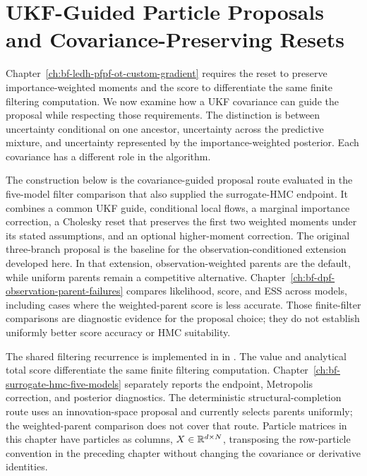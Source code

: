 \chapter{UKF-Guided Particle Proposals and Covariance-Preserving Resets}
\label{ch:bf-ukf-covariance-proposal}

Chapter~\ref{ch:bf-ledh-pfpf-ot-custom-gradient} requires the reset to preserve
importance-weighted moments and the score to differentiate the same finite
filtering computation. We now examine how a UKF covariance can guide the
proposal while respecting those requirements. The distinction is between
uncertainty conditional on one ancestor, uncertainty across the predictive
mixture, and uncertainty represented by the importance-weighted posterior.
Each covariance has a different role in the algorithm.

The construction below is the covariance-guided proposal route evaluated in the
five-model filter comparison that also supplied the surrogate-HMC endpoint.
It combines a common UKF guide, conditional
local flows, a marginal importance correction, a Cholesky reset that preserves
the first two weighted moments under its stated assumptions, and an optional
higher-moment correction. The original three-branch proposal is the baseline
for the observation-conditioned extension developed here. In that extension,
observation-weighted parents are the default, while uniform parents remain a
competitive alternative. Chapter~\ref{ch:bf-dpf-observation-parent-failures}
compares likelihood, score, and ESS across models, including cases where the
weighted-parent score is less accurate. Those finite-filter comparisons are
diagnostic evidence for the proposal choice; they do not establish uniformly
better score accuracy or HMC suitability.

The shared filtering recurrence is implemented in
 in
. The value and
analytical total score differentiate the same finite filtering computation.
Chapter~\ref{ch:bf-surrogate-hmc-five-models} separately reports the endpoint,
Metropolis correction, and posterior diagnostics. The deterministic
structural-completion route uses an innovation-space proposal and currently
selects parents uniformly; the weighted-parent comparison does not cover that
route. Particle matrices in this chapter have particles as columns,
\(X\in\mathbb{R}^{d\times N}\), transposing the row-particle convention in the
preceding chapter without changing the covariance or derivative identities.

\begingroup
{}
\setlength{\emergencystretch}{2em}

\endgroup
